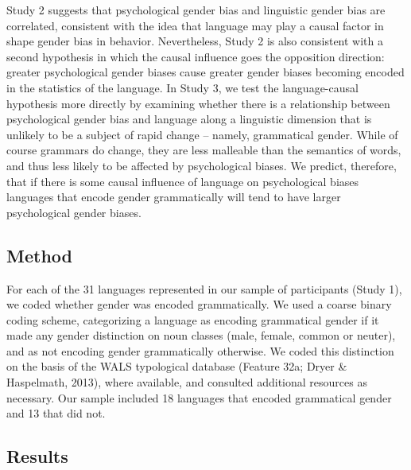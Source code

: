 \documentclass[10pt, letterpaper]{article}
\begin{document}
Study 2 suggests that psychological gender bias and linguistic gender
bias are correlated, consistent with the idea that language may play a
causal factor in shape gender bias in behavior. Nevertheless, Study 2 is
also consistent with a second hypothesis in which the causal influence
goes the opposition direction: greater psychological gender biases cause
greater gender biases becoming encoded in the statistics of the
language. In Study 3, we test the language-causal hypothesis more
directly by examining whether there is a relationship between
psychological gender bias and language along a linguistic dimension that
is unlikely to be a subject of rapid change -- namely, grammatical
gender. While of course grammars do change, they are less malleable than
the semantics of words, and thus less likely to be affected by
psychological biases. We predict, therefore, that if there is some
causal influence of language on psychological biases languages that
encode gender grammatically will tend to have larger psychological
gender biases.

\subsection{Method}\label{method-3}

For each of the 31 languages represented in our sample of participants
(Study 1), we coded whether gender was encoded grammatically. We used a
coarse binary coding scheme, categorizing a language as encoding
grammatical gender if it made any gender distinction on noun classes
(male, female, common or neuter), and as not encoding gender
grammatically otherwise. We coded this distinction on the basis of the
WALS typological database (Feature 32a; Dryer \& Haspelmath, 2013),
where available, and consulted additional resources as necessary. Our
sample included 18 languages that encoded grammatical gender and 13 that
did not.

\subsection{Results}\label{results-3}
\end{document}
